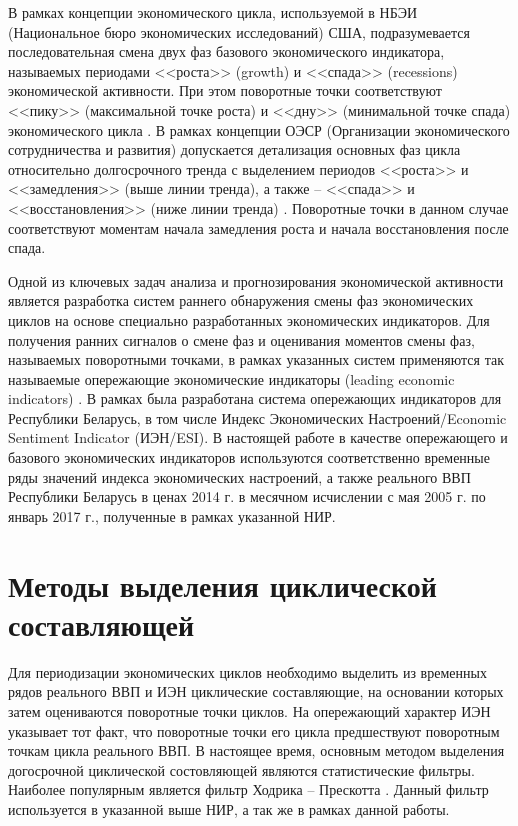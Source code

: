 \documentclass[a4paper,14pt]{extreport}
\begin{document}
	В рамках концепции экономического цикла, используемой в НБЭИ (Национальное бюро экономических исследований) США, подразумевается последовательная смена двух фаз базового экономического индикатора, называемых периодами <<роста>> (growth)  и <<спада>> (recessions) экономической активности. При этом поворотные точки соответствуют <<пику>> (максимальной точке роста) и <<дну>> (минимальной точке спада) экономического цикла \cite{nberDevelopment}.  В рамках концепции ОЭСР (Организации экономического сотрудничества и развития) допускается  детализация основных фаз цикла относительно долгосрочного тренда с выделением периодов <<роста>> и <<замедления>> (выше линии тренда), а также  – <<спада>> и <<восстановления>>  (ниже линии тренда) \cite{oecdCycleExtraction}. Поворотные точки в данном случае соответствуют моментам начала замедления роста и начала восстановления после спада. 
	
	Одной из ключевых задач анализа и прогнозирования экономической активности является разработка систем раннего обнаружения смены фаз экономических циклов на основе специально разработанных экономических индикаторов. Для получения ранних сигналов о смене фаз и оценивания моментов смены фаз, называемых поворотными точками, в рамках указанных систем применяются так называемые опережающие экономические индикаторы (leading economic indicators) \cite{oecdCLI}. В рамках \cite{esiMaking,esiExtra} была разработана система опережающих индикаторов для Республики Беларусь, в том числе Индекс Экономических Настроений/Economic Sentiment Indicator (ИЭН/ESI). В настоящей работе в качестве опережающего и базового экономических индикаторов используются соответственно временные ряды значений индекса экономических настроений, а также реального ВВП Республики Беларусь в ценах 2014 г. в месячном исчислении с мая 2005 г. по январь 2017 г., полученные в рамках указанной НИР.
	
	
	\section{Методы выделения циклической составляющей}
	
	Для периодизации экономических циклов необходимо выделить из временных рядов реального ВВП и ИЭН циклические составляющие, на основании которых затем оцениваются поворотные точки циклов. На опережающий характер ИЭН указывает тот факт, что поворотные точки его цикла предшествуют поворотным точкам цикла реального ВВП. В настоящее время, основным методом выделения догосрочной циклической состовляющей являются статистические фильтры. Наиболее популярным является фильтр Ходрика – Прескотта \cite{oecdCycleExtraction,estrellaFilterDo}. Данный фильтр используется в указанной выше НИР, а так же в рамках данной работы. 
	
\end{document}
